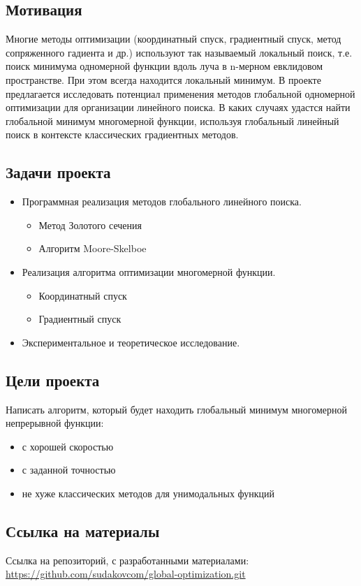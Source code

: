 \subsection{Мотивация}
    Многие методы оптимизации (координатный спуск, градиентный спуск, метод сопряженного гадиента и др.) используют так называемый локальный поиск, т.е. поиск минимума одномерной функции вдоль луча в n-мерном евклидовом пространстве. При этом всегда находится локальный минимум. В проекте предлагается исследовать потенциал применения методов глобальной одномерной оптимизации для организации линейного поиска. В каких случаях удастся найти глобальной минимум многомерной функции, используя глобальный линейный поиск в контексте классических градиентных методов.

    \subsection{Задачи проекта}
    \begin{itemize}
        \item Программная реализация методов глобального линейного поиска.
        \begin{itemize}
            \item Метод Золотого сечения
            \item Алгоритм Moore-Skelboe
        \end{itemize}
        \item Реализация алгоритма оптимизации многомерной функции.
        \begin{itemize}
            \item Координатный спуск
            \item Градиентный спуск
        \end{itemize}
        \item Экспериментальное и теоретическое исследование.
    \end{itemize}

    \subsection{Цели проекта}
    Написать алгоритм, который будет находить глобальный минимум многомерной непрерывной функции:
    \begin{itemize}
        \item с хорошей скоростью
        \item с заданной точностью
        \item не хуже классических методов для унимодальных функций
    \end{itemize}

    \subsection{Ссылка на материалы}
    Ссылка на репозиторий, с разработанными материалами:\\
    \href{https://github.com/sudakovcom/global-optimization.git}{https://github.com/sudakovcom/global-optimization.git}